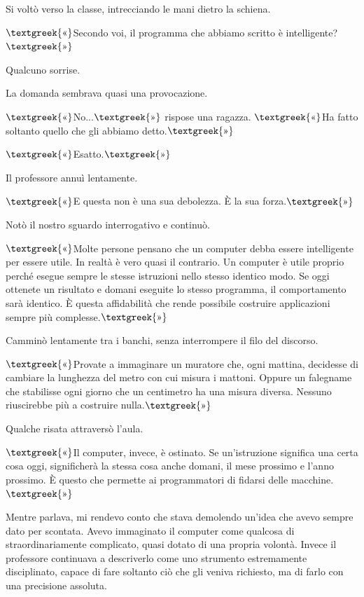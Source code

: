 \documentclass{article}
\begin{document}
Si voltò verso la classe, intrecciando le mani dietro la schiena.

$\text{\textgreek{«}}$Secondo voi, il programma che abbiamo scritto è intelligente?$\text{\textgreek{»}}$

Qualcuno sorrise.

La domanda sembrava quasi una provocazione.

$\text{\textgreek{«}}$No...$\text{\textgreek{»}}$ rispose una ragazza. $\text{\textgreek{«}}$Ha fatto soltanto quello
che gli abbiamo detto.$\text{\textgreek{»}}$

$\text{\textgreek{«}}$Esatto.$\text{\textgreek{»}}$

Il professore annuì lentamente.

$\text{\textgreek{«}}$E questa non è una sua debolezza. È la sua forza.$\text{\textgreek{»}}$

Notò il nostro sguardo interrogativo e continuò.

$\text{\textgreek{«}}$Molte persone pensano che un computer debba essere intelligente per essere utile. In realtà è vero
quasi il contrario. Un computer è utile proprio perché esegue sempre le stesse istruzioni nello stesso identico modo.
Se oggi ottenete un risultato e domani eseguite lo stesso programma, il comportamento sarà identico. È questa
affidabilità che rende possibile costruire applicazioni sempre più complesse.$\text{\textgreek{»}}$

Camminò lentamente tra i banchi, senza interrompere il filo del discorso.

$\text{\textgreek{«}}$Provate a immaginare un muratore che, ogni mattina, decidesse di cambiare la lunghezza del metro
con cui misura i mattoni. Oppure un falegname che stabilisse ogni giorno che un centimetro ha una misura diversa.
Nessuno riuscirebbe più a costruire nulla.$\text{\textgreek{»}}$

Qualche risata attraversò l'aula.

$\text{\textgreek{«}}$Il computer, invece, è ostinato. Se un'istruzione significa una certa cosa oggi, significherà la
stessa cosa anche domani, il mese prossimo e l'anno prossimo. È questo che permette ai programmatori di fidarsi delle
macchine.$\text{\textgreek{»}}$

Mentre parlava, mi rendevo conto che stava demolendo un'idea che avevo sempre dato per scontata. Avevo immaginato il
computer come qualcosa di straordinariamente complicato, quasi dotato di una propria volontà. Invece il professore
continuava a descriverlo come uno strumento estremamente disciplinato, capace di fare soltanto ciò che gli veniva
richiesto, ma di farlo con una precisione assoluta.
\end{document}
